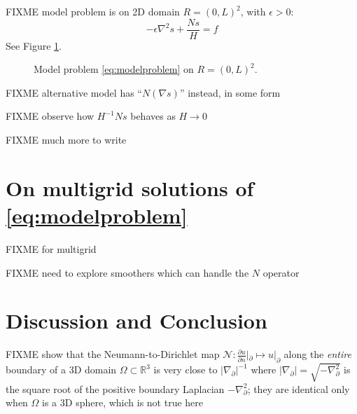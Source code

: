 \documentclass[letterpaper,final,12pt,reqno]{amsart}
\theoremstyle{cstyle}
\theoremstyle{cstyle*}
\theoremstyle{dstyle}
\newcommand{\eps}{\epsilon}
\newcommand{\RR}{\mathbb{R}}
\newcommand{\grad}{\nabla}
\begin{document}
FIXME model problem is on 2D domain $R = (0,L)^2$, with $\eps>0$:
\begin{equation}
-\eps \grad^2 s + \frac{N s}{H} = f  \label{eq:modelproblem}
\end{equation}
See Figure \ref{fig:modelproblem}.

\begin{figure}
\caption{Model problem \eqref{eq:modelproblem} on $R = (0,L)^2$.}
\label{fig:modelproblem}
\end{figure}

FIXME alternative model has ``$N(\grad s)$'' instead, in some form

FIXME observe how $H^{-1} Ns$ behaves as $H\to 0$

FIXME much more to write

\section{On multigrid solutions of \eqref{eq:modelproblem}} \label{sec:numerical}

FIXME \cite{Briggsetal2000,Bueler2021,Trottenbergetal2001} for multigrid

FIXME need to explore smoothers which can handle the $N$ operator

\section{Discussion and Conclusion} \label{sec:conclusion}

FIXME \cite{Girouardetal2022} show that the Neumann-to-Dirichlet map $\mathcal{N}:\frac{\partial u}{\partial n}|_{\partial} \mapsto u|_{\partial}$ along the \emph{entire} boundary of a 3D domain $\Omega \subset \RR^3$ is very close to $|\grad_{\partial}|^{-1}$ where $|\grad_{\partial}| = \sqrt{-\grad_{\partial}^2}$ is the square root of the positive boundary Laplacian $-\grad_{\partial}^2$; they are identical only when $\Omega$ is a 3D sphere, which is not true here





\end{document}
